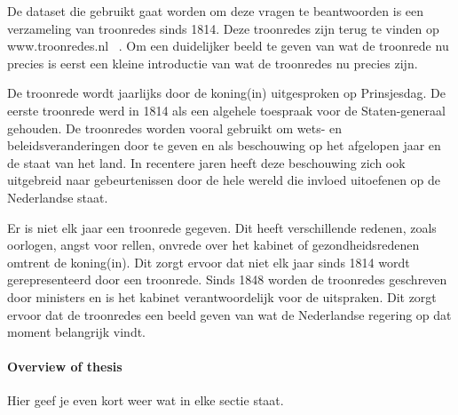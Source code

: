 De dataset die gebruikt gaat worden om deze vragen te beantwoorden is een verzameling van troonredes sinds 1814. Deze troonredes zijn terug te vinden op www.troonredes.nl~\cite{troonredes} .  Om een duidelijker beeld te geven van wat de troonrede nu precies is eerst een kleine introductie van wat de troonredes nu precies zijn.

De troonrede wordt jaarlijks door de koning(in) uitgesproken op Prinsjesdag. De eerste troonrede werd in 1814 als een algehele toespraak voor de Staten-generaal gehouden. De troonredes worden vooral gebruikt om wets- en beleidsveranderingen door te geven en als beschouwing op het afgelopen jaar en de staat van het land. In recentere jaren heeft deze beschouwing zich ook uitgebreid naar gebeurtenissen door de hele wereld die invloed uitoefenen op de Nederlandse staat.

Er is niet elk jaar een troonrede gegeven. Dit heeft verschillende redenen, zoals oorlogen, angst voor rellen, onvrede over het kabinet of gezondheidsredenen omtrent de koning(in). Dit zorgt ervoor dat niet elk jaar sinds 1814 wordt gerepresenteerd door een troonrede. Sinds 1848 worden de troonredes geschreven door ministers en is het kabinet verantwoordelijk voor de uitspraken. Dit zorgt ervoor dat de troonredes een beeld geven van wat de Nederlandse regering op dat moment belangrijk vindt.


\paragraph{Overview of thesis}
Hier geef je even kort weer wat in elke sectie staat.